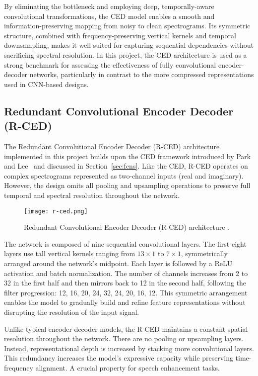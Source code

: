By eliminating the bottleneck and employing deep, temporally-aware convolutional transformations, the CED model enables a smooth and information-preserving mapping from noisy to clean spectrograms. Its symmetric structure, combined with frequency-preserving vertical kernels and temporal downsampling, makes it well-suited for capturing sequential dependencies without sacrificing spectral resolution. In this project, the CED architecture is used as a strong benchmark for assessing the effectiveness of fully convolutional encoder-decoder networks, particularly in contrast to the more compressed representations used in CNN-based designs.

\subsection{Redundant Convolutional Encoder Decoder (R-CED)}
\label{sec:rced}

The Redundant Convolutional Encoder Decoder (R-CED) architecture implemented in this project builds upon the CED framework introduced by Park and Lee~\cite{park2017acoustic} and discussed in Section~\ref{sec:fcns}. Like the CED, R-CED operates on complex spectrograms represented as two-channel inputs (real and imaginary). However, the design omits all pooling and upsampling operations to preserve full temporal and spectral resolution throughout the network.

\begin{figure}[h]
    \centering
    \texttt{[image: r-ced.png]}
    \caption{\label{fig:rced}Redundant Convolutional Encoder Decoder (R-CED) architecture \cite{park2017acoustic}.}
\end{figure}

The network is composed of nine sequential convolutional layers. The first eight layers use tall vertical kernels ranging from \(13 \times 1\) to \(7 \times 1\), symmetrically arranged around the network's midpoint. Each layer is followed by a ReLU activation and batch normalization. The number of channels increases from 2 to 32 in the first half and then mirrors back to 12 in the second half, following the filter progression: 12, 16, 20, 24, 32, 24, 20, 16, 12. This symmetric arrangement enables the model to gradually build and refine feature representations without disrupting the resolution of the input signal.

Unlike typical encoder-decoder models, the R-CED maintains a constant spatial resolution throughout the network. There are no pooling or upsampling layers. Instead, representational depth is increased by stacking more convolutional layers. This redundancy increases the model’s expressive capacity while preserving time-frequency alignment. A crucial property for speech enhancement tasks.

